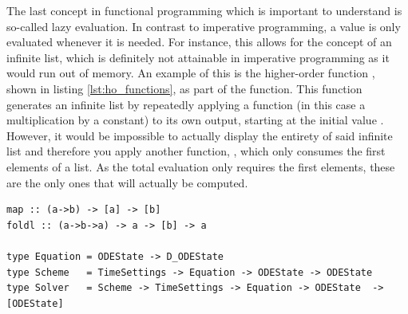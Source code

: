The last concept in functional programming which is important to understand is so-called lazy evaluation. In contrast to imperative programming, a value is only evaluated whenever it is needed. For instance, this allows for the concept of an infinite list, which is definitely not attainable in imperative programming as it would run out of memory. An example of this is the higher-order function , shown in listing \ref{lst:ho_functions}, as part of the  function. This function generates an infinite list by repeatedly applying a function (in this case a multiplication by a constant) to its own output, starting at the initial value . However, it would be impossible to actually display the entirety of said infinite list and therefore you apply another function, , which only consumes the first  elements of a list. As the total evaluation only requires the first  elements, these are the only ones that will actually be computed. \cite{FPintro}

\begin{lstlisting}[caption=Type signatures, label=lst:haskell_types]
map :: (a->b) -> [a] -> [b]
foldl :: (a->b->a) -> a -> [b] -> a

type Equation = ODEState -> D_ODEState
type Scheme   = TimeSettings -> Equation -> ODEState -> ODEState
type Solver   = Scheme -> TimeSettings -> Equation -> ODEState  -> [ODEState]
\end{lstlisting}

